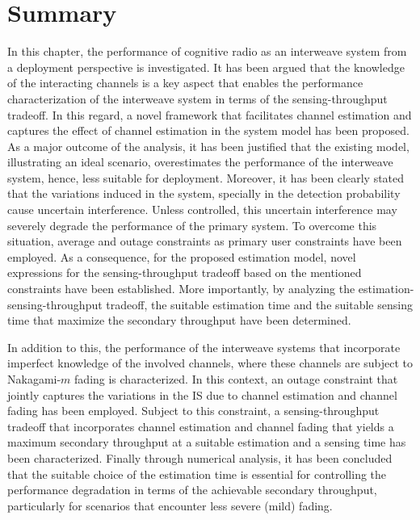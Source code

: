 {\section{Summary} \label{sec:conc}
In this chapter, the performance of cognitive radio as an interweave system from a deployment perspective is investigated. It has been argued that the knowledge of the interacting channels is a key aspect that enables the performance characterization of the interweave system in terms of the sensing-throughput tradeoff. In this regard, a novel framework that facilitates channel estimation and captures the effect of channel estimation in the system model has been proposed. As a major outcome of the analysis, it has been justified that the existing model, illustrating an ideal scenario, overestimates the performance of the interweave system, hence, less suitable for deployment. Moreover, it has been clearly stated that the variations induced in the system, specially in the detection probability cause uncertain interference. Unless controlled, this uncertain interference may severely degrade the performance of the primary system. To overcome this situation, average and outage constraints as primary user constraints have been employed. As a consequence, for the proposed estimation model, novel expressions for the sensing-throughput tradeoff based on the mentioned constraints have been established. More importantly, by analyzing the estimation-sensing-throughput tradeoff, the suitable estimation time and the suitable sensing time that maximize the secondary throughput have been determined. %

In addition to this, the performance of the interweave systems that incorporate imperfect knowledge of the involved channels, where these channels are subject to Nakagami-$m$ fading is characterized. In this context, an outage constraint that jointly captures the variations in the IS due to channel estimation and channel fading has been employed. Subject to this constraint, a sensing-throughput tradeoff that incorporates channel estimation and channel fading that yields a maximum secondary throughput at a suitable estimation and a sensing time has been characterized. Finally through numerical analysis, it has been concluded that the suitable choice of the estimation time is essential for controlling the performance degradation in terms of the achievable secondary throughput, particularly for scenarios that encounter less severe (mild) fading.

}
